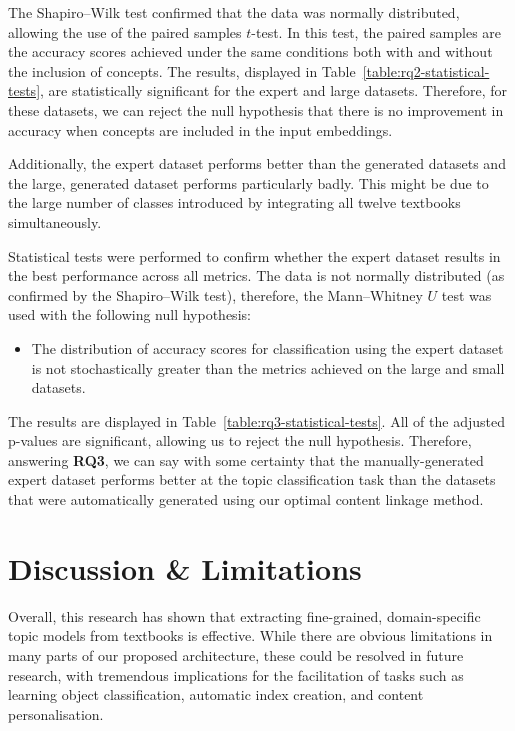 \documentclass[twocolumn]{article}
\newcommand{\nullhypothesis}[1]{
\vspace{-0.5em}
\begin{itemize}[label=$H_0$:]
\item #1
\end{itemize}
}
\begin{document}
The Shapiro–Wilk test confirmed that the data was normally distributed, allowing the use of the paired samples $t$-test. In this test, the paired samples are the accuracy scores achieved under the same conditions both with and without the inclusion of concepts. The results, displayed in Table~\ref{table:rq2-statistical-tests}, are statistically significant for the expert and large datasets. Therefore, for these datasets, we can reject the null hypothesis that there is no improvement in accuracy when concepts are included in the input embeddings.



Additionally, the expert dataset performs better than the generated datasets and the large, generated dataset performs particularly badly. This might be due to the large number of classes introduced by integrating all twelve textbooks simultaneously.

Statistical tests were performed to confirm whether the expert dataset results in the best performance across all metrics. The data is not normally distributed (as confirmed by the Shapiro–Wilk test), therefore, the Mann–Whitney $U$ test was used with the following null hypothesis:

\nullhypothesis{
    The distribution of accuracy scores for classification using the expert dataset is not stochastically greater than the metrics achieved on the large and small datasets.
}



The results are displayed in Table~\ref{table:rq3-statistical-tests}. All of the adjusted p-values are significant, allowing us to reject the null hypothesis. Therefore, answering \textbf{RQ3}, we can say with some certainty that the manually-generated expert dataset performs better at the topic classification task than the datasets that were automatically generated using our optimal content linkage method.

\section{Discussion \& Limitations} \label{sec:discussion}

Overall, this research has shown that extracting fine-grained, domain-specific topic models from textbooks is effective. While there are obvious limitations in many parts of our proposed architecture, these could be resolved in future research, with tremendous implications for the facilitation of tasks such as learning object classification, automatic index creation, and content personalisation.
\end{document}
